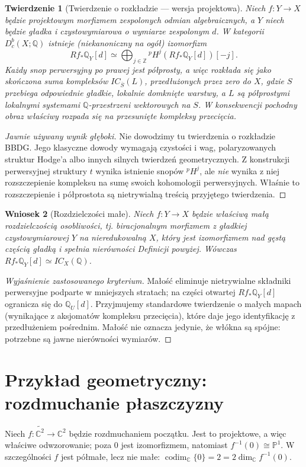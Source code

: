\documentclass[11pt,a4paper,oneside]{report}
\newcommand{\C}{\mathbb{C}}
\newcommand{\Z}{\mathbb{Z}}
\newcommand{\Q}{\mathbb{Q}}
\theoremstyle{plain}
\newtheorem{twierdzenie}{Twierdzenie}[section]
\newtheorem{wniosek}[twierdzenie]{Wniosek}
\theoremstyle{definition}
\theoremstyle{remark}
\begin{document}
\begin{twierdzenie}[Twierdzenie o rozkładzie --- wersja projektowa]
\label{thm:decomposition-xiii}
Niech $f:Y\to X$ będzie projektowym morfizmem
zespolonych odmian algebraicznych, a $Y$
niech będzie gładka i czystowymiarowa o wymiarze
zespolonym $d$. W kategorii $D_c^b(X;\Q)$ istnieje
(niekanoniczny na ogół) izomorfizm
\[
Rf_*\Q_Y[d]\simeq
\bigoplus_{j\in\Z}{}^p\!H^j(Rf_*\Q_Y[d])[-j].
\]
Każdy snop perwersyjny po prawej jest półprosty,
a więc rozkłada się jako skończona suma kompleksów
$IC_{\overline S}(L)$, przedłużonych przez zero
do $X$, gdzie $S$ przebiega odpowiednie gładkie,
lokalnie domknięte warstwy, a $L$ są
półprostymi lokalnymi systemami $\Q$-przestrzeni
wektorowych na $S$. W konsekwencji pochodny obraz
właściwy rozpada się na przesunięte kompleksy przecięcia.
\end{twierdzenie}
\begin{proof}[Jawnie używany wynik głęboki]
Nie dowodzimy tu twierdzenia o rozkładzie BBDG.
Jego klasyczne dowody wymagają czystości i wag,
polaryzowanych struktur Hodge'a albo innych
silnych twierdzeń geometrycznych.
Z konstrukcji perwersyjnej struktury $t$ wynika
istnienie snopów ${}^p\!H^j$, ale \emph{nie}
wynika z niej rozszczepienie kompleksu na sumę
swoich kohomologii perwersyjnych.
Właśnie to rozszczepienie i półprostota są
nietrywialną treścią przyjętego twierdzenia.
\end{proof}
\begin{wniosek}[Rozdzielczości małe]
\label{cor:small-map-ic-xiii}
Niech $f:Y\to X$ będzie właściwą \emph{małą}
rozdzielczością osobliwości, tj. biracjonalnym
morfizmem z gładkiej czystowymiarowej
$Y$ na nieredukowalną $X$, który jest izomorfizmem
nad gęstą częścią gładką i spełnia nierówności
Definicji powyżej. Wówczas
$Rf_*\Q_Y[d]\simeq IC_X(\Q)$.
\end{wniosek}
\begin{proof}[Wyjaśnienie zastosowanego kryterium]
Małość eliminuje nietrywialne składniki
perwersyjne podparte w mniejszych stratach;
na części otwartej $Rf_*\Q_Y[d]$ ogranicza się
do $\Q_U[d]$. Przyjmujemy standardowe twierdzenie
o małych mapach (wynikające z aksjomatów
kompleksu przecięcia), które daje jego
identyfikację z przedłużeniem pośrednim.
Małość nie oznacza jedynie, że włókna są spójne:
potrzebne są jawne nierówności wymiarów.
\end{proof}

\section{Przykład geometryczny: rozdmuchanie płaszczyzny}
\label{sec:blowup-decomp-xiii}
Niech $f:\widetilde{\C^2}\to\C^2$ będzie
rozdmuchaniem początku. Jest to projektowe,
a więc właściwe odwzorowanie; poza $0$ jest
izomorfizmem, natomiast $f^{-1}(0)\cong\mathbb P^1$.
W szczególności $f$ jest półmałe, lecz nie małe:
$\operatorname{codim}_\C\{0\}=2=2\dim_\C f^{-1}(0)$.
\end{document}

